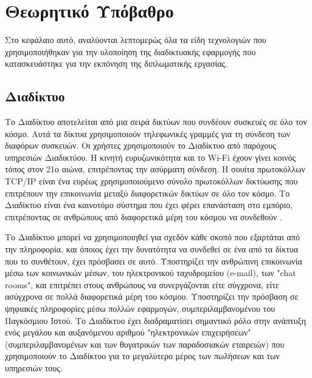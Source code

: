 \chapter{Θεωρητικό Υπόβαθρο}
Στο κεφάλαιο αυτό, αναλύονται λεπτομερώς όλα τα είδη τεχνολογιών που χρησιμοποιήθηκαν για την υλοποίηση της διαδικτυακής εφαρμογής που κατασκευάστηκε για την εκπόνηση της διπλωματικής εργασίας.

\section{Διαδίκτυο}
Το Διαδίκτυο αποτελείται από μια σειρά δικτύων που συνδέουν συσκευές σε όλο τον κόσμο. Αυτά τα δίκτυα χρησιμοποιούν τηλεφωνικές γραμμές για τη σύνδεση των διαφόρων συσκευών. Οι χρήστες χρησιμοποιούν το Διαδίκτυο από παρόχους υπηρεσιών Διαδικτύου. Η κινητή ευρυζωνικότητα και το Wi-Fi έχουν γίνει κοινός τόπος στον 21ο αιώνα, επιτρέποντας την ασύρματη σύνδεση. Η σουίτα πρωτοκόλλων TCP/IP είναι ένα ευρέως χρησιμοποιούμενο σύνολο πρωτοκόλλων δικτύωσης που επιτρέπουν την επικοινωνία μεταξύ διαφορετικών δικτύων σε όλο τον κόσμο. Το Διαδίκτυο είναι ένα καινοτόμο σύστημα που έχει φέρει επανάσταση στο εμπόριο, επιτρέποντας σε ανθρώπους από διαφορετικά μέρη του κόσμου να συνδεθούν \cite{internet_britannica}.

Το Διαδίκτυο μπορεί να χρησιμοποιηθεί για σχεδόν κάθε σκοπό που εξαρτάται από την πληροφορία, και όποιος έχει την δυνατότητα να συνδεθεί σε ένα από τα δίκτυα που το συνθέτουν, έχει πρόσβασει σε αυτό. Υποστηρίζει την ανθρώπινη επικοινωνία μέσω των κοινωνικών μέσων, του ηλεκτρονικού ταχυδρομείου (e-mail), των "chat rooms", και επιτρέπει στους ανθρώπους να συνεργάζονται είτε σύγχρονα, είτε ασύγχρονα σε πολλά διαφορετικά μέρη του κόσμου. Υποστηρίζει την πρόσβαση σε ψηφιακές πληροφορίες μέσω πολλών εφαρμογών, συμπεριλαμβανομένου του Παγκόσμιου Ιστού. Το Διαδίκτυο έχει διαδραματίσει σημαντικό ρόλο στην ανάπτυξη ενός μεγάλου και αυξανόμενου αριθμού "ηλεκτρονικών επιχειρήσεων" (συμπεριλαμβανομένων και των θυγατρικών των παραδοσιακών εταιρειών) που χρησιμοποιούν το Διαδίκτυο για το μεγαλύτερο μέρος των πωλήσεων και των υπηρεσιών τους.

